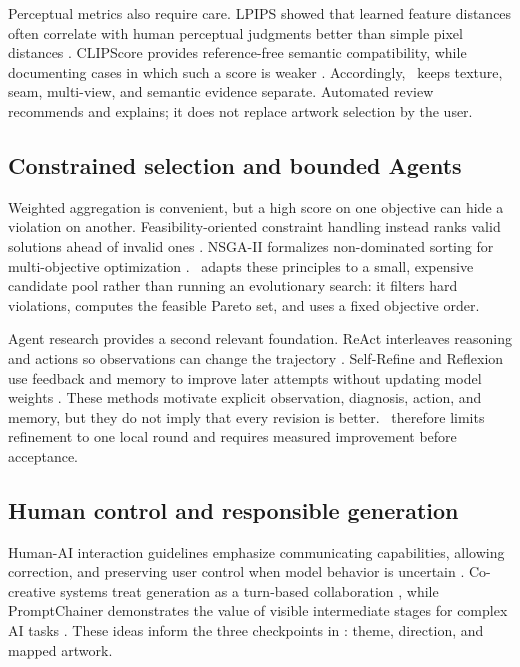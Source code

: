 Perceptual metrics also require care. LPIPS showed that learned feature distances
often correlate with human perceptual judgments better than simple pixel
distances \citep{zhang2018lpips}. CLIPScore provides reference-free semantic
compatibility, while documenting cases in which such a score is weaker
\citep{hessel2021clipscore}. Accordingly, \skinsmith\ keeps texture, seam,
multi-view, and semantic evidence separate. Automated review recommends and
explains; it does not replace artwork selection by the user.

\subsection{Constrained selection and bounded Agents}

Weighted aggregation is convenient, but a high score on one objective can hide a
violation on another. Feasibility-oriented constraint handling instead ranks
valid solutions ahead of invalid ones \citep{deb2000constraints}. NSGA-II
formalizes non-dominated sorting for multi-objective optimization
\citep{deb2002nsgaii}. \skinsmith\ adapts these principles to a small, expensive
candidate pool rather than running an evolutionary search: it filters hard
violations, computes the feasible Pareto set, and uses a fixed objective order.

Agent research provides a second relevant foundation. ReAct interleaves reasoning
and actions so observations can change the trajectory \citep{yao2023react}.
Self-Refine and Reflexion use feedback and memory to improve later attempts without
updating model weights \citep{madaan2023selfrefine,shinn2023reflexion}. These
methods motivate explicit observation, diagnosis, action, and memory, but they do
not imply that every revision is better. \skinsmith\ therefore limits refinement
to one local round and requires measured improvement before acceptance.

\subsection{Human control and responsible generation}

Human-AI interaction guidelines emphasize communicating capabilities, allowing
correction, and preserving user control when model behavior is uncertain
\citep{amershi2019guidelines}. Co-creative systems treat generation as a turn-based
collaboration \citep{guzdial2019cocreative}, while PromptChainer demonstrates the
value of visible intermediate stages for complex AI tasks
\citep{wu2022promptchainer}. These ideas inform the three checkpoints in
\skinsmith: theme, direction, and mapped artwork.

